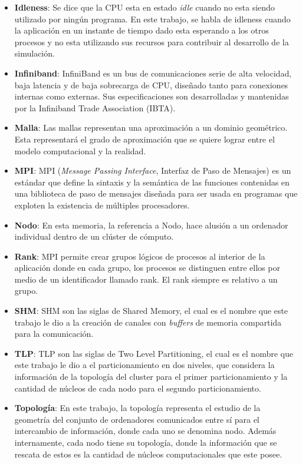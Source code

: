 {\begin{itemize}
    \item \textbf{Idleness}: Se dice que la CPU esta en estado \textit{idle} cuando no esta siendo utilizado por ningún programa. En este trabajo, se habla de idleness cuando la aplicación en un instante de tiempo dado esta esperando a los otros procesos y no esta utilizando sus recursos para contribuir al desarrollo de la simulación.
    \item \textbf{Infiniband}: InfiniBand es un bus de comunicaciones serie de alta velocidad, baja latencia y de baja sobrecarga de CPU, diseñado tanto para conexiones internas como externas. Sus especificaciones son desarrolladas y mantenidas por la Infiniband Trade Association (IBTA).
    \item \textbf{Malla}: Las mallas representan una aproximación a un dominio geométrico. Esta representará el grado de aproximación que se quiere lograr entre el modelo computacional y la realidad.
    \item \textbf{MPI}: MPI (\textit{Message Passing Interface}, Interfaz de Paso de Mensajes) es un estándar que define la sintaxis y la semántica de las funciones contenidas en una biblioteca de paso de mensajes diseñada para ser usada en programas que exploten la existencia de múltiples procesadores.
    \item \textbf{Nodo}: En esta memoria, la referencia a Nodo, hace alusión a un ordenador individual dentro de un clúster de cómputo.
    \item \textbf{Rank}: MPI permite crear grupos lógicos de procesos al interior de la aplicación donde en cada grupo, los procesos se distinguen entre ellos por medio de un identificador llamado rank. El rank siempre es relativo a un grupo.
    \item \textbf{SHM}: SHM son las siglas de Shared Memory, el cual es el nombre que este trabajo le dio a la creación de canales con \textit{buffers} de memoria compartida para la comunicación.
    \item \textbf{TLP}: TLP son las siglas de Two Level Partitioning, el cual es el nombre que este trabajo le dio a el particionamiento en dos niveles, que considera la información de la topología del cluster para el primer particionamiento y la cantidad de núcleos de cada nodo para el segundo particionamiento.
    \item \textbf{Topología}: En este trabajo, la topología representa el estudio de la geometría del conjunto de ordenadores comunicados entre sí para el intercambio de información, donde cada uno se denomina nodo. Además internamente, cada nodo tiene su topología, donde la información que se rescata de estos es la cantidad de núcleos computacionales que este posee.
\end{itemize}}